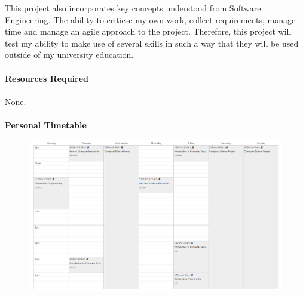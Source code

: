 \documentclass[a4paper, 12pt]{article}
\begin{document}
            This project also incorporates key concepts understood from Software Engineering.
            The ability to criticse my own work, collect requirements, manage time and manage an
            agile approach to the project. Therefore, this project will test my ability to make use
            of several skills in such a way that they will be used outside of my university education. \\\\
            \textbf{Resources Required} \\\\
            None. \\\\
            \clearpage
            \textbf{Personal Timetable}
                \begin{figure}[h]
                    \centering
                    \includegraphics[width=175mm]{timetable.png}
                \end{figure}    

    \clearpage
    \printbibliography
\end{document}
